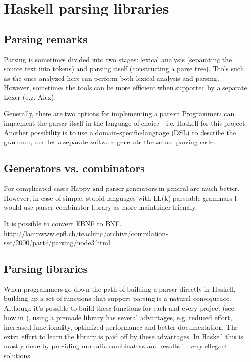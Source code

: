 
\section{Haskell parsing libraries}
\label{sec:libraries}

\subsection{Parsing remarks}
Parsing is sometimes divided into two stages: lexical analysis (separating the source text into tokens) and parsing itself (constructing a parse tree).
Tools such as the ones analyzed here can perform both lexical analysis and parsing.
However, sometimes the tools can be more efficient when supported by a separate Lexer (e.g. Alex).


Generally, there are two options for implementing a parser:
Programmers can implement the parser itself in the language of choice - i.e. Haskell for this project.
Another possibility is to use a domain-specific-language (DSL) to describe the grammar, and let a separate software generate the actual parsing code.

\subsection{Generators vs. combinators}
For complicated cases Happy and parser generators in general are much better. However, in case of simple, stupid languages with LL(k) parseable grammars I would use parser combinator library as more maintainer-friendly.

It is possible to convert EBNF to BNF. http://lampwww.epfl.ch/teaching/archive/compilation-ssc/2000/part4/parsing/node3.html

\subsection{Parsing libraries}
When programmers go down the path of building a parser directly in Haskell, building up a set of functions that support parsing is a natural consequence.
Although it's possible to build these functions for each and every project (see how in \cite{monadic-parsing}), using a premade library has several advantages, e.g. reduced effort, increased functionality, optimized performance and better documentation.
The extra effort to learn the library is paid off by these advantages.
In Haskell this is mostly done by providing monadic combinators and results in very ellegant solutions \cite{monadic-parsing}.

